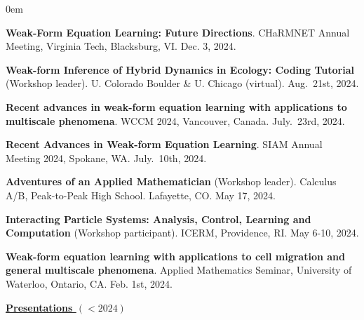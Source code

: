 \documentclass[letterpaper,11pt,oneside]{article}
\newcommand{\headr}[1]{\uline{\Large{\textbf{#1}} \hfill } \\ \vspace{-0.5cm}}
\begin{document}
\begin{enumerate}[label={[\arabic*]}]
\itemsep0em 

\item \textbf{Weak-Form Equation Learning: Future Directions}. CHaRMNET Annual Meeting, Virginia Tech, Blacksburg, VI. Dec. 3, 2024.

\item \textbf{Weak-form Inference of Hybrid Dynamics in
Ecology: Coding Tutorial} (Workshop leader). U. Colorado Boulder \& U. Chicago (virtual). Aug.\ 21st, 2024.

\item \textbf{Recent advances in weak-form equation learning
with applications to multiscale phenomena}. WCCM 2024, Vancouver, Canada. July.\ 23rd, 2024.

\item \textbf{Recent Advances in Weak-form Equation Learning}. SIAM Annual 
Meeting 2024, Spokane, WA. July.\ 10th, 2024.

\item \textbf{Adventures of an Applied Mathematician} (Workshop leader). Calculus A/B, Peak-to-Peak High School. Lafayette, CO. May 17, 2024.

\item \textbf{Interacting Particle Systems: Analysis, Control, Learning and Computation} (Workshop participant). ICERM, Providence, RI. May 6-10, 2024.

\item \textbf{Weak-form equation learning with applications to cell migration and general multiscale phenomena}. Applied Mathematics Seminar, University of Waterloo, Ontario, CA. Feb. 1st, 2024.

\end{enumerate}

\headr{Presentations $(<2024)$}
\end{document}
